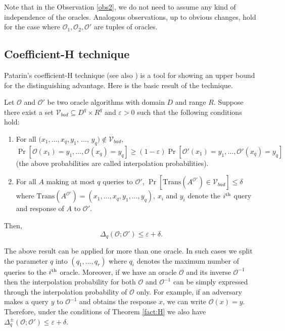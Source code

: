 \documentclass{llncs}
\begin{document}
Note that in the Observation \ref{obs2}, we do not need to assume any kind of independence of the oracles. Analogous observations, up to obvious changes, hold for the case where $\mathcal{O}_1,\mathcal{O}_2,\mathcal{O}'$ are tuples of oracles.

\subsection{Coefficient-H technique}
Patarin's coefficient-H technique \cite{Patarin1} (see also \cite{Patarin3}) is a tool for showing an upper bound for the distinguishing advantage. Here is the basic result of the technique.

\begin{theorem}
\label{fact:H}
Let $\mathcal{O}$ and $\mathcal{O}'$ be two oracle algorithms with domain $D$ and range $R$. Suppose there exist a set $\mathcal{V}_{bad} \subseteq D^q \times R^q$ and $\varepsilon > 0$ such that the following conditions hold:
\begin{enumerate}
\item
For all $(x_1, \ldots, x_q, y_1$, $\ldots$, $y_q) \not\in \mathcal{V}_{bad}$,
\[\Pr[\mathcal{O}(x_1) = y_1, \ldots, \mathcal{O}(x_q) = y_q] \geq (1 - \varepsilon) \Pr[\mathcal{O}'(x_1) = y_1, \ldots, \mathcal{O}'(x_q) = y_q]\]
(the above probabilities are called interpolation probabilities).
\item
For all $A$ making at most $q$ queries to $\mathcal{O}'$, $\Pr[\mathrm{Trans}(A^{\mathcal{O}'}) \in \mathcal{V}_{bad}] \leq \delta$ where $\mathrm{Trans}(A^{\mathcal{O}'}) = (x_1, \ldots, x_q, y_1, \ldots, y_q)$, $x_i$ and $y_i$ denote the $i^{\rm{th}}$  query and response of $A$ to $\mathcal{O}'$.
\end{enumerate}
Then,
\[\Delta_q(\mathcal{O};\mathcal{O}') \leq \varepsilon + \delta.\]
\end{theorem}

The above result can be applied for more than one oracle. In such cases we split the parameter $q$ into $(q_1, \ldots, q_r)$ where $q_i$ denotes the maximum number of queries to the $i^{\rm{th}}$ oracle. Moreover, if we have an oracle $\mathcal{O}$ and its inverse $\mathcal{O}^{-1}$ then the interpolation probability for both $\mathcal{O}$ and $\mathcal{O}^{-1}$ can be simply expressed through the interpolation probability of $\mathcal{O}$ only. For example, if an adversary makes a query $y$ to $\mathcal{O}^{-1}$ and obtains the response $x$, we can write $\mathcal{O}(x) = y$.
Therefore, under the conditions of Theorem \ref{fact:H} we also have $\Delta^{\pm}_q(\mathcal{O};\mathcal{O}') \leq \varepsilon + \delta$.
\end{document}
